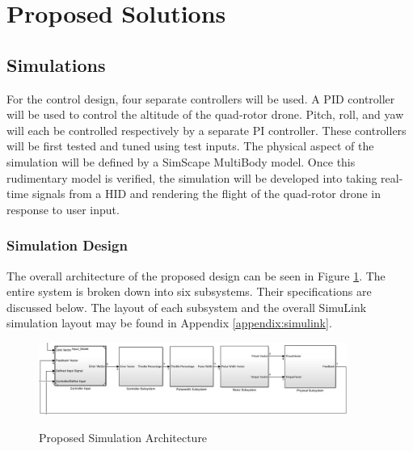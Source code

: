 
\section{Proposed Solutions}

\subsection{Simulations}
For the control design, four separate controllers will be used.  A PID controller will be used to control the altitude of the quad-rotor drone.  Pitch, roll, and yaw will each be controlled respectively by a separate PI controller. These controllers will be first tested and tuned using test inputs.  The physical aspect of the simulation will be defined by a SimScape MultiBody model.  Once this rudimentary model is verified, the simulation will be developed into taking real-time signals from a HID and rendering the flight of the quad-rotor drone in response to user input.

\subsubsection{Simulation Design}
The overall architecture of the proposed design can be seen in Figure \ref{fig:sim_arch}.  The entire system is broken down into six subsystems.  Their specifications are discussed below.  The layout of each subsystem and the overall SimuLink simulation layout may be found in Appendix \ref{appendix:simulink}.

\begin{figure}[H]
	\centering
	\includegraphics[width=0.9\textwidth]{system_arch.jpg}
	\label{fig:sim_arch}
	\caption{Proposed Simulation Architecture}
\end{figure}

